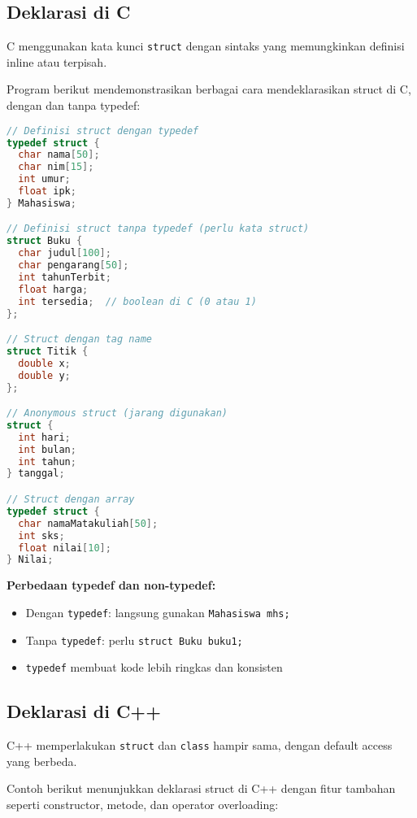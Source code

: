 \documentclass[../main.tex]{subfiles}
\begin{document}
\subsection{Deklarasi di C}

C menggunakan kata kunci \texttt{struct} dengan sintaks yang memungkinkan definisi inline atau terpisah.

Program berikut mendemonstrasikan berbagai cara mendeklarasikan struct di C, dengan dan tanpa typedef:

\begin{lstlisting}[language=C, caption={Deklarasi struct di C}]
// Definisi struct dengan typedef
typedef struct {
  char nama[50];
  char nim[15];
  int umur;
  float ipk;
} Mahasiswa;

// Definisi struct tanpa typedef (perlu kata struct)
struct Buku {
  char judul[100];
  char pengarang[50];
  int tahunTerbit;
  float harga;
  int tersedia;  // boolean di C (0 atau 1)
};

// Struct dengan tag name
struct Titik {
  double x;
  double y;
};

// Anonymous struct (jarang digunakan)
struct {
  int hari;
  int bulan;
  int tahun;
} tanggal;

// Struct dengan array
typedef struct {
  char namaMatakuliah[50];
  int sks;
  float nilai[10];
} Nilai;
\end{lstlisting}

\textbf{Perbedaan typedef dan non-typedef:}
\begin{itemize}
  \item Dengan \texttt{typedef}: langsung gunakan \texttt{Mahasiswa mhs;}
  \item Tanpa \texttt{typedef}: perlu \texttt{struct Buku buku1;}
  \item \texttt{typedef} membuat kode lebih ringkas dan konsisten
\end{itemize}

\subsection{Deklarasi di C++}

C++ memperlakukan \texttt{struct} dan \texttt{class} hampir sama, dengan default access yang berbeda.

Contoh berikut menunjukkan deklarasi struct di C++ dengan fitur tambahan seperti constructor, metode, dan operator overloading:
\end{document}

